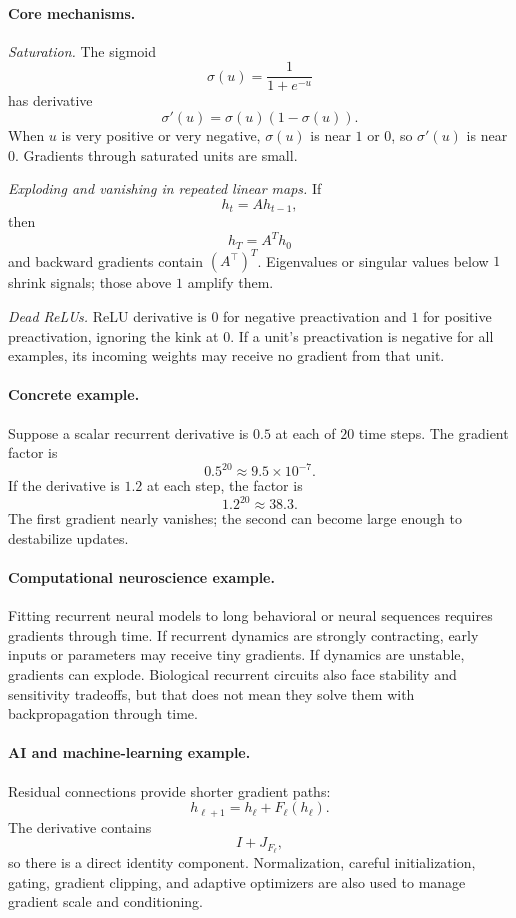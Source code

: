 \paragraph{Core mechanisms.}
\emph{Saturation.} The sigmoid
\[
\sigma(u)=\frac1{1+e^{-u}}
\]
has derivative
\[
\sigma'(u)=\sigma(u)(1-\sigma(u)).
\]
When \(u\) is very positive or very negative, \(\sigma(u)\) is near \(1\) or \(0\), so \(\sigma'(u)\) is near \(0\). Gradients through saturated units are small.

\emph{Exploding and vanishing in repeated linear maps.} If
\[
h_t=Ah_{t-1},
\]
then
\[
h_T=A^T h_0
\]
and backward gradients contain \((A^\top)^T\). Eigenvalues or singular values below \(1\) shrink signals; those above \(1\) amplify them.

\emph{Dead ReLUs.} ReLU derivative is \(0\) for negative preactivation and \(1\) for positive preactivation, ignoring the kink at \(0\). If a unit's preactivation is negative for all examples, its incoming weights may receive no gradient from that unit.

\paragraph{Concrete example.}
Suppose a scalar recurrent derivative is \(0.5\) at each of \(20\) time steps. The gradient factor is
\[
0.5^{20}\approx9.5\times10^{-7}.
\]
If the derivative is \(1.2\) at each step, the factor is
\[
1.2^{20}\approx38.3.
\]
The first gradient nearly vanishes; the second can become large enough to destabilize updates.

\paragraph{Computational neuroscience example.}
Fitting recurrent neural models to long behavioral or neural sequences requires gradients through time. If recurrent dynamics are strongly contracting, early inputs or parameters may receive tiny gradients. If dynamics are unstable, gradients can explode. Biological recurrent circuits also face stability and sensitivity tradeoffs, but that does not mean they solve them with backpropagation through time.

\paragraph{AI and machine-learning example.}
Residual connections provide shorter gradient paths:
\[
h_{\ell+1}=h_\ell+F_\ell(h_\ell).
\]
The derivative contains
\[
I+J_{F_\ell},
\]
so there is a direct identity component. Normalization, careful initialization, gating, gradient clipping, and adaptive optimizers are also used to manage gradient scale and conditioning.

